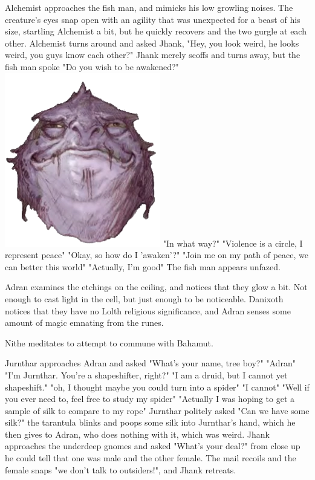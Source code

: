\documentclass[letterpaper,10pt,twoside,twocolumn,openany]{book}
\begin{document}
Alchemist approaches the fish man, and mimicks his low growling noises. The creature's eyes snap open with an agility that was unexpected for a beast of his size, startling Alchemist a bit, but he quickly recovers and the two gurgle at each other. Alchemist turns around and asked Jhank, "Hey, you look weird, he looks weird, you guys know each other?" Jhank merely scoffs and turns away, but the fish man spoke "Do you wish to be awakened?"\\
	{\centering
	\includegraphics[width=0.5\linewidth]{img/dist/fish_man.png}
	}
"In what way?"
"Violence is a circle, I represent peace"
"Okay, so how do I 'awaken'?"
"Join me on my path of peace, we can better this world"
"Actually, I'm good"
The fish man appears unfazed.

Adran examines the etchings on the ceiling, and notices that they glow a bit. Not enough to cast light in the cell, but just enough to be noticeable. Danixoth notices that they have no Lolth religious significance, and Adran senses some amount of magic emnating from the runes. 

Nithe meditates to attempt to commune with Bahamut.

Jurnthar approaches Adran and asked "What's your name, tree boy?" "Adran" "I'm Jurnthar. You're a shapeshifter, right?" "I am a druid, but I cannot yet shapeshift." "oh, I thought maybe you could turn into a spider" "I cannot" "Well if you ever need to, feel free to study my spider" "Actually I was hoping to get a sample of silk to compare to my rope" Jurnthar politely asked "Can we have some silk?" the tarantula blinks and poops some silk into Jurnthar's hand, which he then gives to Adran, who does nothing with it, which was weird. Jhank approaches the underdeep gnomes and asked "What's your deal?" from close up he could tell that one was male and the other female. The mail recoils and the female snaps "we don't talk to outsiders!", and Jhank retreats.
\end{document}
